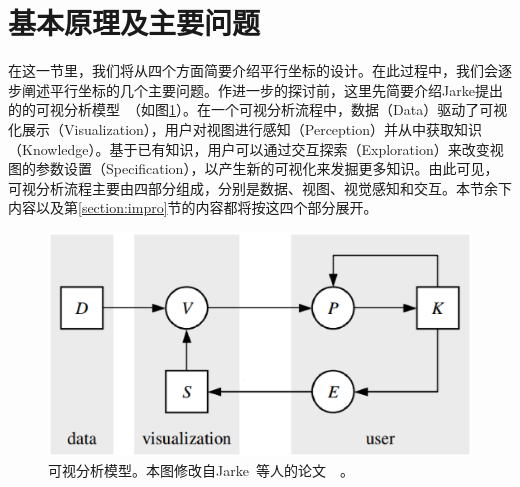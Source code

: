 \documentclass[12pt,twocolumn]{article}
\begin{document}
\section{基本原理及主要问题}
\label{section:basics&prob}
在这一节里，我们将从四个方面简要介绍平行坐标的设计。在此过程中，我们会逐步阐述平行坐标的几个主要问题。作进一步的探讨前，这里先简要介绍Jarke提出的的可视分析模型~\citep{van2005value}（如图\ref{fig:Vis_model}）。在一个可视分析流程中，数据（Data）驱动了可视化展示（Visualization），用户对视图进行感知（Perception）并从中获取知识（Knowledge）。基于已有知识，用户可以通过交互探索（Exploration）来改变视图的参数设置（Specification），以产生新的可视化来发掘更多知识。由此可见，可视分析流程主要由四部分组成，分别是数据、视图、视觉感知和交互。本节余下内容以及第\ref{section:impro}节的内容都将按这四个部分展开。

\begin{figure}[!htb]
\centering
\includegraphics[width=0.9\linewidth]{images/Vis_model.eps}
\caption{\label{fig:Vis_model}可视分析模型。本图修改自Jarke~等人的论文~\citep{van2005value}~。
}
\end{figure}
\end{document}
